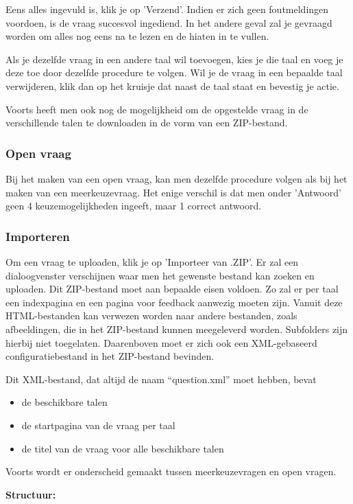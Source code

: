 \documentclass[]{article}
\begin{document}
Eens alles ingevuld is, klik je op 'Verzend'. Indien er zich geen foutmeldingen voordoen, is de vraag succesvol ingediend. In het andere geval zal je gevraagd worden om alles nog eens na te lezen en de hiaten in te vullen.

Als je dezelfde vraag in een andere taal wil toevoegen, kies je die taal en voeg je deze toe door dezelfde procedure te volgen. Wil je de vraag in een bepaalde taal verwijderen, klik dan op het kruisje dat naast de taal staat en bevestig je actie. 

Voorts heeft men ook nog de mogelijkheid om de opgestelde vraag in de verschillende talen te downloaden in de vorm van een ZIP-bestand. 

\subsubsection{Open vraag}

Bij het maken van een open vraag, kan men dezelfde procedure volgen als bij het maken van een meerkeuzevraag. Het enige verschil is dat men onder 'Antwoord' geen 4 keuzemogelijkheden ingeeft, maar 1 correct antwoord.

\subsubsection{Importeren}
Om een vraag te uploaden, klik je op 'Importeer van .ZIP'. Er zal een dialoogvenster verschijnen waar men het gewenste bestand kan zoeken en uploaden. Dit ZIP-bestand moet aan bepaalde eisen voldoen. Zo zal er per taal een indexpagina en een pagina voor feedback aanwezig moeten zijn. Vanuit deze HTML-bestanden kan verwezen worden naar andere bestanden, zoals afbeeldingen, die in het ZIP-bestand kunnen meegeleverd worden. Subfolders zijn hierbij niet toegelaten. Daarenboven moet er zich ook een XML-gebaseerd configuratiebestand in het ZIP-bestand bevinden. 

Dit XML-bestand, dat altijd de naam "`question.xml"' moet hebben, bevat
\begin{itemize}
\item de beschikbare talen
\item de startpagina van de vraag per taal
\item de titel van de vraag voor alle beschikbare talen
\end{itemize}

Voorts wordt er onderscheid gemaakt tussen meerkeuzevragen en open vragen.

\textbf{Structuur:}
\end{document}
